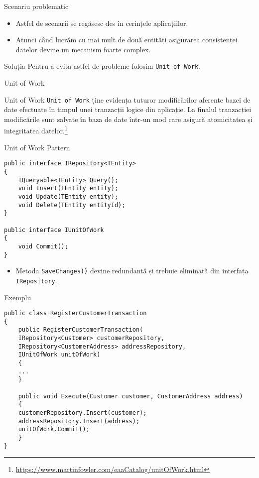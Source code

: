 \documentclass[presentation]{beamer}
\begin{document}
\begin{frame}[label={sec:orgb21077d}]{Scenariu problematic}
\begin{itemize}
\item Astfel de scenarii se regăsesc des în cerințele aplicațiilor.
\item Atunci când lucrăm cu mai mult de două entități asigurarea consistenței datelor devine un mecanism foarte complex.
\end{itemize}
\end{frame}
\begin{frame}[label={sec:org56a40f0},fragile]{Soluția}
 Pentru a evita astfel de probleme folosim \texttt{Unit of Work}.
\end{frame}
\begin{frame}[label={sec:orga80847d},fragile]{Unit of Work}
 \begin{block}{Unit of Work}
\texttt{Unit of Work} ține evidența tuturor modificărilor aferente bazei de date efectuate în timpul unei tranzacții logice din aplicație. La finalul tranzacției modificările sunt salvate în baza de date într-un mod care asigură atomicitatea și integritatea datelor.\footnote{\url{https://www.martinfowler.com/eaaCatalog/unitOfWork.html}}
\end{block}
\end{frame}
\begin{frame}[label={sec:orgdd06b86},fragile]{Unit of Work Pattern}
 \begin{verbatim}
public interface IRepository<TEntity>
{
    IQueryable<TEntity> Query();
    void Insert(TEntity entity);
    void Update(TEntity entity);
    void Delete(TEntity entityId);
}

public interface IUnitOfWork
{
    void Commit();
}
\end{verbatim}
\begin{itemize}
\item Metoda \texttt{SaveChanges()} devine redundantă și trebuie eliminată din interfața \texttt{IRepository}.
\end{itemize}
\end{frame}
\begin{frame}[label={sec:org760ed30},fragile]{Exemplu}
 \begin{verbatim}
public class RegisterCustomerTransaction
{
    public RegisterCustomerTransaction(
	IRepository<Customer> customerRepository,
	IRepository<CustomerAddress> addressRepository,
	IUnitOfWork unitOfWork)
    {
	...
    }

    public void Execute(Customer customer, CustomerAddress address)
    {
	customerRepository.Insert(customer);
	addressRepository.Insert(address);
	unitOfWork.Commit();
    }
}
\end{verbatim}
\end{frame}
\end{document}

